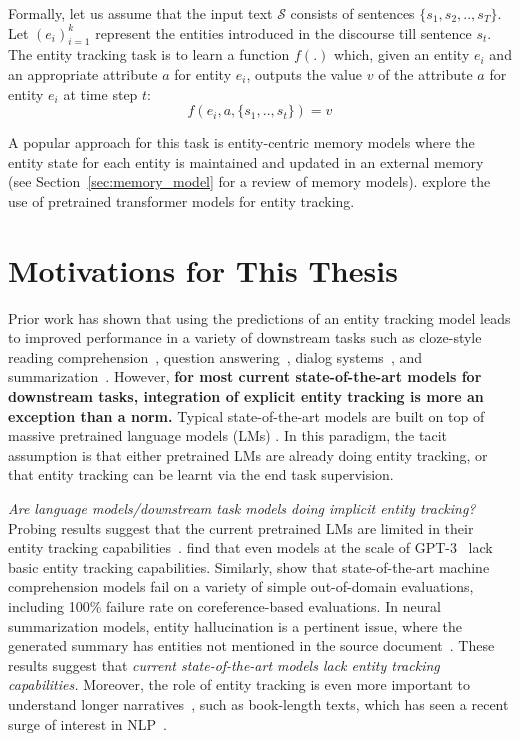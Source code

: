 \documentclass[12pt]{thesis-umich}[thesis]
\begin{document}
Formally, let us assume that the input text $\mathcal{S}$ consists of sentences $\{s_1, s_2, ..,  s_T\}$. Let $(e_i)_{i=1}^k$ represent the entities introduced in the discourse till sentence $s_t$. 
The entity tracking task is to learn a function $f(.)$ which, given an entity $e_i$ and an appropriate attribute $a$ for entity $e_i$, outputs the value $v$ of the attribute $a$ for entity $e_i$ at time step $t$:  
$$f(e_i, a, \{s_1, .., s_t\}) = v $$ 


A popular approach for this task is entity-centric memory models where the entity state for each entity is maintained and updated in an external memory ~\cite{henaff2016tracking, bosselut-18} (see Section~\ref{sec:memory_model} for a review of memory models). \citet{gupta-durrett-2019-effective} explore the use of pretrained transformer models for entity tracking. 



\section{Motivations for This Thesis}

Prior work has shown that using the predictions of an entity tracking model leads to improved performance in a variety of downstream tasks such as cloze-style reading comprehension~\citep{dhingra-etal-2018-neural, hoang-etal-2018-entity, cheng2020entity}, question answering~\citep{dasigi-etal-2019-quoref}, dialog systems~\citep{gao-etal-2019-interconnected}, and  summarization~\citep{sharma-etal-2019-entity, narayan-etal-2021-planning}.
However, \textbf{for most current state-of-the-art  models for downstream tasks, integration of explicit entity tracking is more an exception than a norm.}
Typical state-of-the-art  models are built on top of massive pretrained language models (LMs) \citep[\textit{inter alia}]{ devlin-etal-2019-bert, radford2019language, brown2020language}. 
In this paradigm, the tacit assumption is that either pretrained LMs are already doing entity tracking, or that entity tracking can be learnt via the end task supervision. 


\emph{Are language models/downstream task models doing implicit entity tracking?}
Probing results suggest that the current pretrained LMs are limited in their entity tracking capabilities~\citep{tenney2019probing, liu2019linguistic, sorodoc-etal-2020-probing}. 
\citet{schuster-linzen-2022-sentence} find that even models at the scale of GPT-3~\cite{brown2020language} lack basic entity tracking capabilities.  
Similarly, \citet{tulio2020checklist} show that state-of-the-art machine comprehension models fail on a variety of simple out-of-domain  evaluations, including 100\% failure rate on coreference-based evaluations. 
In neural summarization models, entity hallucination is a pertinent issue, where the generated summary has entities not mentioned in the source document~\cite{kryscinski-etal-2019-neural}. 
These results suggest that \emph{current state-of-the-art models lack entity tracking capabilities.} 
Moreover, the role of entity tracking is even more important to understand longer narratives~\cite{wu2021recursive}, such as book-length texts, which has seen a recent surge of interest in NLP~\cite{shaham-etal-2022-scrolls}. 
\end{document}
